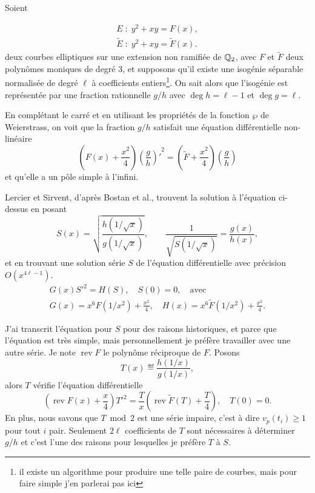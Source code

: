 \documentclass{article}
\DeclareMathOperator{\rev}{rev}
\begin{document}
Soient

\begin{equation}
  \label{eq:9}
  \begin{gathered}
    E \;:\; y^2 + xy = F(x),\\
    \tilde{E} \;:\; y^2 + xy = \tilde{F}(x).
  \end{gathered}
\end{equation}
deux courbes elliptiques sur une extension non ramifiée de $\mathbb{Q}_2$,
avec $F$ et $\tilde{F}$ deux polynômes moniques de degré $3$, et
supposons qu'il existe une isogénie séparable normalisée de degré
$\ell$ à coefficients entiers\footnote{il existe un algorithme pour
  produire une telle paire de courbes, mais pour faire simple j'en
  parlerai pas ici}. On sait alors que l'isogénie est représentée par
une fraction rationnelle $g/h$ avec $\deg h=\ell-1$ et $\deg g =\ell$.

En complétant le carré et en utilisant les propriétés de la fonction
$\wp$ de Weierstrass, on voit que la fraction $g/h$ satisfait une
équation différentielle non-linéaire
\begin{equation}
  \label{eq:3}
  \left(F(x)+\frac{x^2}{4}\right){\left(\frac{g}{h}\right)'}^2 =
  \left(\tilde{F}+\frac{x^2}{4}\right)\left(\frac{g}{h}\right)
\end{equation}
et qu'elle a un pôle simple à l'infini.

Lercier et Sirvent, d'après Bostan et al., trouvent la solution à
l'équation ci-dessus en posant
\begin{equation}
  \label{eq:4}
  S(x) = \sqrt{\frac{h(1/\sqrt{x})}{g(1/\sqrt{x})}}, \qquad \frac{1}{\sqrt{S(1/\sqrt{x})}} = \frac{g(x)}{h(x)},
\end{equation}
et en trouvant une solution série $S$ de l'équation différentielle
avec précision $O(x^{4\ell-1})$.
\begin{equation}
  \label{eq:5}
  \begin{gathered}
    G(x){S'}^2 = H(S), \quad S(0) = 0,\quad\text{avec}\\
    G(x) = x^6F(1/x^2) + \frac{x^2}{4}, \quad H(x) =
    x^6\tilde{F}(1/x^2) + \frac{x^2}{4}.
  \end{gathered}
\end{equation}

J'ai transcrit l'équation pour $S$ pour des raisons historiques, et
parce que l'équation est très simple, mais personnellement je préfère
travailler avec une autre série. Je note $\rev F$ le polynôme
réciproque de $F$. Posons
\begin{equation}
  \label{eq:12}
  T(x) \eqdef \frac{h(1/x)}{g(1/x)},
\end{equation}
alors $T$ vérifie l'équation différentielle
\begin{equation}
  \label{eq:31}
  \left(\rev F(x) + \frac{x}{4}\right){T'}^2 = \frac{T}{x}\left(\rev\tilde{F}(T) + \frac{T}{4}\right),
  \quad T(0)=0.
\end{equation}
En plus, nous savons que $T \bmod 2$ est une série impaire, c'est à
dire $v_p(t_i)\ge 1$ pour tout $i$ pair. Seulement $2\ell$
coefficients de $T$ sont nécessaires à déterminer $g/h$ et c'est l'une
des raisons pour lesquelles je préfère $T$ à $S$.
\end{document}
